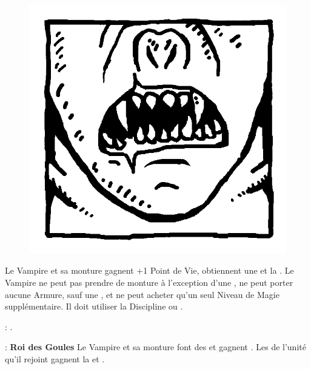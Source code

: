 
\begin{figure}
\centering
\includegraphics[width=\logosize]{logos/logo_strigoi.png}
\end{figure}
Le Vampire et sa monture gagnent +1 Point de Vie, obtiennent une  et la \hatred{}. Le Vampire ne peut pas prendre de monture à l'exception d'une \shriekinghorror{}, ne peut porter aucune Armure, sauf une \mountsprotection{}, et ne peut acheter qu'un seul Niveau de Magie supplémentaire. Il doit utiliser la Discipline \wilderness{} ou \necromancy{}.

\vspace{0.5cm}
\bloodties{} : \textbf{\ghouls{}}.

\vspace{0.5cm}
\ancientbloodpower{} : \textbf{Roi des Goules}\dotfill{}\newline%
Le Vampire et sa monture font des \poisonedattacks{} et gagnent . Les \ghouls{} de l'unité qu'il rejoint gagnent la \hatred{} et .


